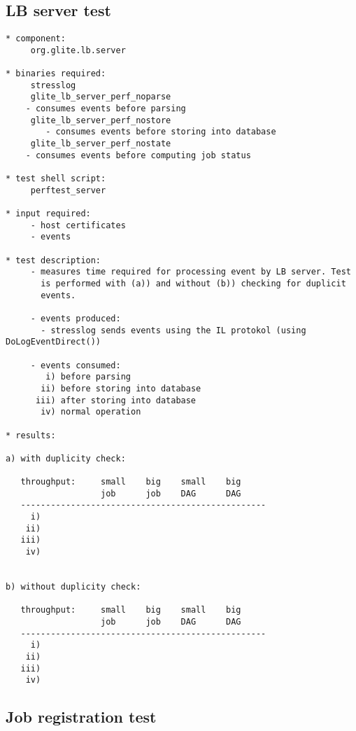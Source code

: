\subsection{LB server test}


\begin{verbatim}
* component:
     org.glite.lb.server

* binaries required:
     stresslog
     glite_lb_server_perf_noparse
	- consumes events before parsing
     glite_lb_server_perf_nostore
        - consumes events before storing into database
     glite_lb_server_perf_nostate
	- consumes events before computing job status

* test shell script:
     perftest_server

* input required:
     - host certificates
     - events

* test description:
     - measures time required for processing event by LB server. Test
       is performed with (a)) and without (b)) checking for duplicit
       events. 

     - events produced:
	   - stresslog sends events using the IL protokol (using DoLogEventDirect())

     - events consumed:
	    i) before parsing
	   ii) before storing into database
	  iii) after storing into database
	   iv) normal operation

* results:

a) with duplicity check:

   throughput:     small    big    small    big 
                   job      job    DAG      DAG 
   -------------------------------------------------
     i)
    ii)
   iii)
    iv)


b) without duplicity check:

   throughput:     small    big    small    big 
                   job      job    DAG      DAG 
   -------------------------------------------------
     i)
    ii)
   iii)
    iv)

\end{verbatim}

\subsection{Job registration test}


